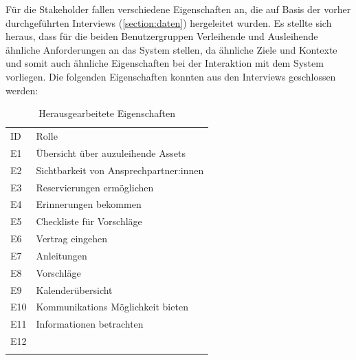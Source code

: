 Für die Stakeholder fallen verschiedene Eigenschaften an, die auf Basis der vorher durchgeführten
Interviews (\ref{section:daten}) hergeleitet wurden. Es stellte sich heraus, dass für die beiden
Benutzergruppen \glqq Verleihende\grqq{} und \glqq Ausleihende\grqq{} ähnliche Anforderungen an das
System stellen, da ähnliche Ziele und Kontexte und somit auch ähnliche Eigenschaften bei der
Interaktion mit dem System vorliegen. Die folgenden Eigenschaften konnten aus den Interviews
geschlossen werden:

\begin{table}[h]
        \centering
        \caption{Herausgearbeitete Eigenschaften}
        \begin{tabular}{ll}
                \arrayrulecolor{maincolor}\hline
                \sffamily\color{maincolor}ID & \sffamily\color{maincolor}Rolle \\
                \arrayrulecolor{maincolor}\hline
                E1                           & Übersicht über auzuleihende Assets \\
                E2                           & Sichtbarkeit von Ansprechpartner:innen \\
                E3                           & Reservierungen ermöglichen        \\
                E4                           & Erinnerungen bekommen             \\
                E5                           & Checkliste für Vorschläge         \\
                E6                           & Vertrag eingehen                  \\
                E7                           & Anleitungen                       \\
                E8                           & Vorschläge                        \\
                E9                           & Kalenderübersicht                 \\
                E10                          & Kommunikations Möglichkeit bieten \\
                E11                          & Informationen betrachten          \\
                E12                          &                                   \\
                \arrayrulecolor{maincolor}\hline
        \end{tabular}
        \label{table:e}
        \hfill
\end{table}




